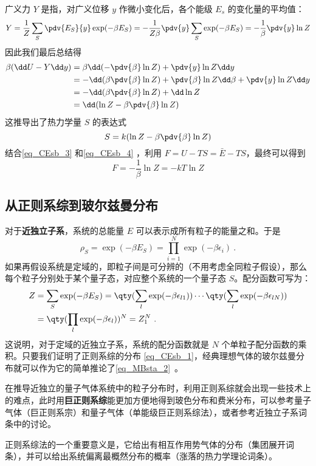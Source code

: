 广义力 $Y$ 是指，对广义位移 $y$ 作微小变化后，各个能级 $E_s$ 的变化量的平均值：
\begin{equation}
Y=\frac{1}{Z} \sum_S \pdv{E_S}{y} \exp(-\beta E_S)=-\frac{1}{Z\beta}\pdv{y} \sum_S\exp(-\beta E_S)=-\frac{1}{\beta} \pdv{y} \ln Z
\end{equation}
因此我们最后总结得
\begin{equation}
\begin{aligned}
\beta(\dd U-Y\dd y)&=\beta \dd (-\pdv{\beta} \ln Z)+\pdv{y} \ln Z\dd y\\
&= -\dd(\beta\pdv{\beta} \ln Z)+\pdv{\beta}\ln Z\dd \beta +\pdv{y} \ln Z\dd y\\
&= -\dd(\beta\pdv{\beta} \ln Z)+\dd \ln Z\\
&=\dd (\ln Z-\beta\pdv{\beta} \ln Z)
\end{aligned}
\end{equation}
这推导出了热力学量 $S$ 的表达式
\begin{equation}\label{eq_CEsb_4}
S=k(\ln Z-\beta\pdv{\beta}\ln Z)
\end{equation}
结合\autoref{eq_CEsb_3} 和\autoref{eq_CEsb_4} ，利用 $F=U-TS=\bar E-TS$，最终可以得到
\begin{equation}
F=-\frac{1}{\beta}\ln Z=-kT\ln Z
\end{equation}



\subsection{从正则系综到玻尔兹曼分布}
对于\textbf{近独立子系}，系统的总能量 $E$ 可以表示成所有粒子的能量之和。于是
\begin{equation}
\rho_S=\exp(-\beta E_S)=\prod_{i=1}^N\exp(-\beta\epsilon_i)~.
\end{equation}
如果再假设系统是定域的，即粒子间是可分辨的（不用考虑全同粒子假设），那么每个粒子分别处于某个量子态，对应整个系统的一个量子态 $S$。配分函数可写为：
\begin{equation}
\begin{aligned}
Z&=\sum_S\exp(-\beta E_S)=\qty(\sum_{l}\exp(-\beta\epsilon_{l1}))\cdots\qty(\sum_{l}\exp(-\beta\epsilon_{lN}))\\
&=\qty(\prod_{l}\exp(-\beta\epsilon_{l}))^N=Z_1^N~.
\end{aligned}
\end{equation}
这说明，对于定域的近独立子系，系统的配分函数就是 $N$ 个单粒子配分函数的乘积。只要我们证明了正则系综的分布 \autoref{eq_CEsb_1}，经典理想气体的玻尔兹曼分布就可以作为它的简单推论了\autoref{eq_MBsta_2}~。

在推导近独立的量子气体系统中的粒子分布时，利用正则系综就会出现一些技术上的难点，此时用\textbf{巨正则系综}能更加方便地得到玻色分布和费米分布，可以参考量子气体（巨正则系宗）和量子气体（单能级巨正则系综法），或者参考近独立子系词条中的讨论。

正则系综法的一个重要意义是，它给出有相互作用势气体的分布（集团展开词条），并可以给出系统偏离最概然分布的概率（涨落的热力学理论词条）。
